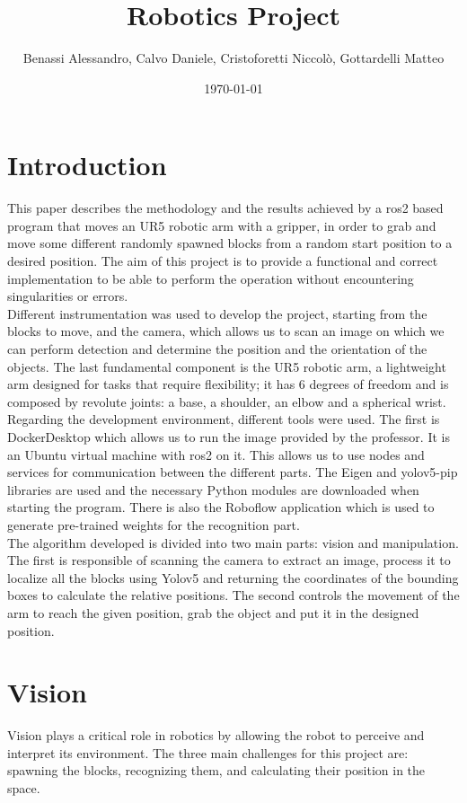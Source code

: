 \documentclass[12pt,a4paper]{article}
\title{Robotics Project}
\author{Benassi Alessandro, Calvo Daniele, Cristoforetti Niccolò, Gottardelli Matteo}
\date{\today}
\begin{document}
\maketitle
\tableofcontents
\newpage

\section{Introduction}\label{sec:intro}
This paper describes the methodology and the results achieved by a ros2 based program that moves an UR5 robotic arm with a gripper, in order to grab and move some different randomly spawned blocks from a random start position to a desired position. The aim of this project is to provide a functional and correct implementation to be able to perform the operation without encountering singularities or errors.\\
Different instrumentation was used to develop the project, starting from the blocks to move, and the camera, which allows us to scan an image on which we can perform detection and determine the position and the orientation of the objects. The last fundamental component is the UR5 robotic arm, a lightweight arm designed for tasks that require flexibility; it has 6 degrees of freedom and is composed by revolute joints: a base, a shoulder, an elbow and a spherical wrist.\\
Regarding the development environment, different tools were used. The first is DockerDesktop which allows us to run the image provided by the professor. It is an Ubuntu virtual machine with ros2 on it. This allows us to use nodes and services for communication between the different parts. The Eigen and yolov5-pip libraries are used and the necessary Python modules are downloaded when starting the program. There is also the Roboflow application which is used to generate pre-trained weights for the recognition part.\\ 
The algorithm developed is divided into two main parts: vision and manipulation. The first is responsible of scanning the camera to extract an image, process it to localize all the blocks using Yolov5 and returning the coordinates of the bounding boxes to calculate the relative positions. The second controls the movement of the arm to reach the given position, grab the object and put it in the designed position.


\section{Vision}\label{sec:vision}
Vision plays a critical role in robotics by allowing the robot to perceive and interpret its environment. 
The three main challenges for this project are: spawning the blocks, recognizing them, and calculating their position in the space.
\end{document}
